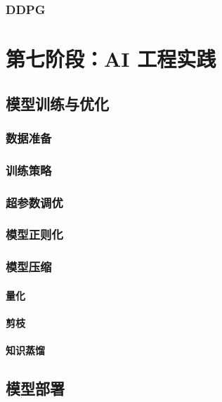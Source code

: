 \documentclass[12pt,UTF8]{ctexbook}
\begin{document}
\section{DDPG}

\part{第七阶段：AI 工程实践}

\chapter{模型训练与优化}
\label{chap:model_training}

\section{数据准备}

\section{训练策略}

\section{超参数调优}

\section{模型正则化}

\section{模型压缩}

\subsection{量化}

\subsection{剪枝}

\subsection{知识蒸馏}

\chapter{模型部署}
\label{chap:model_deployment}
\end{document}
